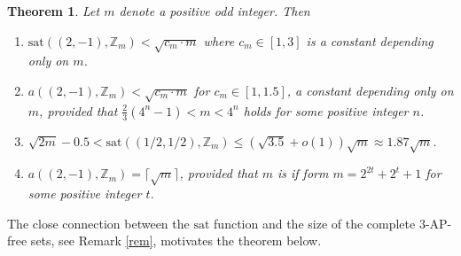 \documentclass[11pt]{article}
\numberwithin{table}{section}
\newcommand{\F}{{\mathbb F}}
\newcommand{\sat}{\mathrm{sat}}
\newtheorem{theorem}{Theorem}[section]
\theoremstyle{definition}
\begin{document}
	
	
	
	\begin{theorem}\label{maingroups} Let $m$ denote a positive odd integer. Then
		\begin{enumerate}[\rm(1)] \vspace{-0.2cm}
			\item     $\sat((2,-1), \mathbb{Z}_m)<\sqrt{c_m\cdot m}$ where $c_m\in [1,3]$ is a constant depending only on $m$.
			\vspace{-0.2cm}
			\item %
			$a((2,-1), \mathbb{Z}_m)<\sqrt{c_m \cdot m}$ for $c_m\in [1, 1.5]$, a constant depending only on $m$, provided that $\frac23(4^n-1) < m<4^n$ holds for some positive integer $n$.\vspace{-0.2cm}
			\item $\sqrt{2m}-0.5<\sat((1/2, 1/2), \mathbb{Z}_m)\leq (\sqrt{3.5}+o(1))\sqrt{m}\approx 1.87\sqrt{m}.$
			\vspace{-0.2cm}
			\item  $a((2,-1), \mathbb{Z}_m)=\lceil\sqrt{m}\rceil$, provided that $m$ is if form $m=2^{2t}+2^t+1$ for some positive integer $t$.%
		\end{enumerate}
	\end{theorem}
	\vspace{-0.3cm}
	The close connection between the $\sat$ function and the size of the complete $3$-AP-free sets, see Remark \ref{rem}, motivates the theorem below.
	
\end{document}
